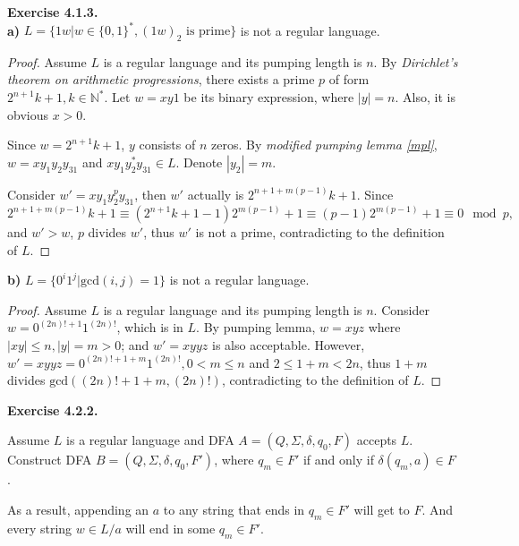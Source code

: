 \documentclass[a4paper]{article}
\newtheorem*{proof}{Proof}
\newenvironment{exercise}[1]{
	\par
	\noindent\textbf{Exercise #1.}\quad
}{
	\par
	\bigskip
}
\newcommand{\Nset}{\mathbb{N}}
\begin{document}
\begin{exercise}{4.1.3}\hspace{0pt}\\
    \textbf{a)} $L=\{1w|w\in\{0,1\}^*,(1w)_2\text{ is prime}\}$ is not a regular language.
    \begin{proof}
        Assume $L$ is a regular language and its pumping length is $n$. 
        By \textit{Dirichlet's theorem on arithmetic progressions}, there exists a prime $p$
        of form $2^{n+1}k+1,k\in\Nset^*$. Let $w=xy1$ be its binary expression, where $|y|=n$.
        Also, it is obvious $x>0$.\par
        Since $w=2^{n+1}k+1$, $y$ consists of $n$ zeros.
        By \textit{modified pumping lemma \ref{mpl}},
        $w=xy_1y_2y_31$ and $xy_1y_2^*y_31\in L$. Denote $|y_2|=m$.\par
        Consider $w'=xy_1y_2^{p}y_31$, then $w'$ actually is $2^{n+1+m(p-1)}k+1$.
        Since 
        $$
        2^{n+1+m(p-1)}k+1\equiv (2^{n+1}k+1-1)2^{m(p-1)}+1 \equiv (p-1)2^{m(p-1)}+1\equiv 0\mod p,
        $$
        and $w'>w$, $p$ divides $w'$, thus $w'$ is not a prime,
        contradicting to the definition of $L$.
    \end{proof}
    \textbf{b)} $L=\{0^i1^j|\text{gcd}(i,j)=1\}$ is not a regular language.
    \begin{proof}
        Assume $L$ is a regular language and its pumping length is $n$. 
        Consider $w=0^{(2n)!+1}1^{(2n)!}$, which is in $L$. By pumping lemma,
        $w=xyz$ where $|xy|\leqslant n,|y|=m>0$; and $w'=xyyz$ is also acceptable.
        However, $w'=xyyz=0^{(2n)!+1+m}1^{(2n)!},0<m\leqslant n$ and $2\leqslant 1+m<2n$,
        thus $1+m$ divides $\text{gcd}((2n)!+1+m,(2n)!)$, contradicting to the definition of $L$.
    \end{proof}
\end{exercise}

\begin{exercise}{4.2.2}
    Assume $L$ is a regular language and DFA $A=(Q,\Sigma,\delta,q_0,F)$ accepts $L$.
    Construct DFA $B=(Q,\Sigma,\delta,q_0,F')$, where $q_m\in F'$ if and only if $\delta(q_m,a)\in F$.\par
    As a result, appending an $a$ to any string that ends in $q_m\in F'$ will get to $F$.
    And every string $w\in L/a$ will end in some $q_m\in F'$.
\end{exercise}
\end{document}
